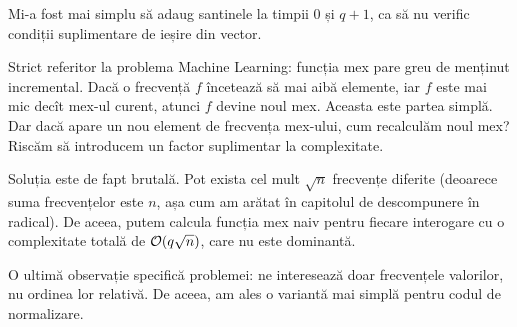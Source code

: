 \documentclass[../main.tex]{subfiles}
\begin{document}
Mi-a fost mai simplu să adaug santinele la timpii 0 și $q + 1$, ca să nu verific condiții suplimentare de ieșire din vector.

Strict referitor la problema Machine Learning: funcția mex pare greu de menținut incremental. Dacă o frecvență $f$ încetează să mai aibă elemente, iar $f$ este mai mic decît mex-ul curent, atunci $f$ devine noul mex. Aceasta este partea simplă. Dar dacă apare un nou element de frecvența mex-ului, cum recalculăm noul mex? Riscăm să introducem un factor suplimentar la complexitate.

Soluția este de fapt brutală. Pot exista cel mult $\sqrt{n}$ frecvențe diferite (deoarece suma frecvențelor este $n$, așa cum am arătat în capitolul de descompunere în radical). De aceea, putem calcula funcția mex naiv pentru fiecare interogare cu o complexitate totală de $\mathcal{O}(q \sqrt{n})$, care nu este dominantă.

O ultimă observație specifică problemei: ne interesează doar frecvențele valorilor, nu ordinea lor relativă. De aceea, am ales o variantă mai simplă pentru codul de normalizare.
\end{document}
